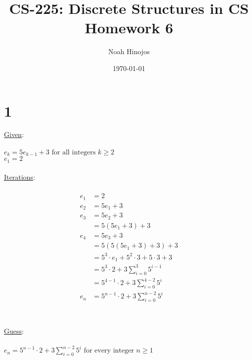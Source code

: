 \documentclass[12pt]{article}
\title{
  \textbf{CS-225: Discrete Structures in CS} \\
  Homework 6
  }
\author{Noah Hinojos}
\date{\today}
\begin{document}
\maketitle
\section*{1}
\underline{Given}:
\\ \\
$e_k = 5e_{k-1} + 3 \text{ for all integers } k \geq 2$ \\
$e_1 = 2$
\\ \\
\underline{Iterations}:
\\ \\
\begin{align*}
  e_1 &= 2 \\
  e_2 &= 5e_1 + 3 \\
  e_3 &= 5e_2 + 3 \\
  &= 5(5e_1 + 3) + 3 \\
  e_4 &= 5e_3 + 3\\
  &= 5(5(5e_1 + 3) + 3) + 3\\
  &= 5^3\cdot e_1 + 5^2\cdot3 + 5\cdot 3 + 3 \\
  &= 5^{3}\cdot 2 + 3\sum_{i=0}^{3}5^{i-1} \\
  &= 5^{4-1}\cdot 2 + 3\sum_{i=0}^{4-2}5^{i} \\
  e_n &= 5^{n-1}\cdot 2 + 3\sum_{i=0}^{n-2}5^{i} \\
\end{align*}
\\ \\
\underline{Guess}:
\\ \\
$e_n = 5^{n-1}\cdot 2 + 3\sum_{i=0}^{n-2}5^{i} \text{ for every integer }n \geq 1$


\newpage
\end{document}
